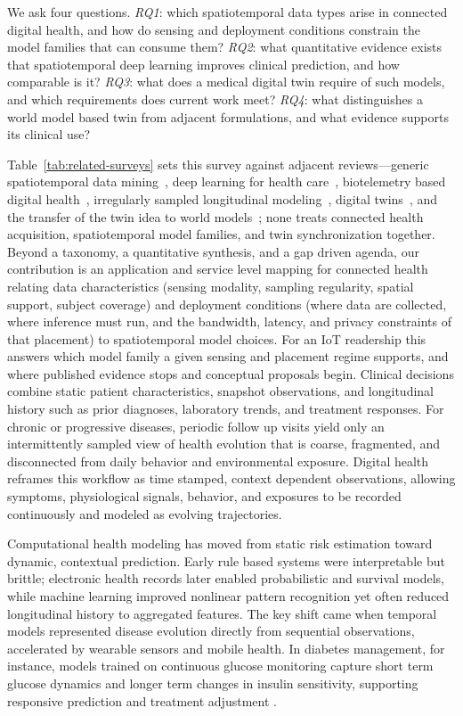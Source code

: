 \documentclass[journal]{IEEEtran}
\begin{document}
We ask four questions. \emph{RQ1}: which spatiotemporal data types arise in connected digital health, and how do sensing and deployment conditions constrain the model families that can consume them? \emph{RQ2}: what quantitative evidence exists that spatiotemporal deep learning improves clinical prediction, and how comparable is it? \emph{RQ3}: what does a medical digital twin require of such models, and which requirements does current work meet? \emph{RQ4}: what distinguishes a world model based twin from adjacent formulations, and what evidence supports its clinical use?

Table~\ref{tab:related-surveys} sets this survey against adjacent reviews---generic spatiotemporal data mining~\cite{wang2022deep,atluri2018stdm}, deep learning for health care~\cite{miotto2018deeplearning}, biotelemetry based digital health~\cite{Busnatu2022}, irregularly sampled longitudinal modeling~\cite{shukla2021irregular}, digital twins~\cite{Wang2023Survey,Sel2025VVUQ}, and the transfer of the twin idea to world models~\cite{Zheng2026DTtoWM}; none treats connected health acquisition, spatiotemporal model families, and twin synchronization together. Beyond a taxonomy, a quantitative synthesis, and a gap driven agenda, our contribution is an application and service level mapping for connected health relating data characteristics (sensing modality, sampling regularity, spatial support, subject coverage) and deployment conditions (where data are collected, where inference must run, and the bandwidth, latency, and privacy constraints of that placement) to spatiotemporal model choices. For an IoT readership this answers which model family a given sensing and placement regime supports, and where published evidence stops and conceptual proposals begin.
\else
Clinical decisions combine static patient characteristics, snapshot observations, and longitudinal history such as prior diagnoses, laboratory trends, and treatment responses. For chronic or progressive diseases, periodic follow up visits yield only an intermittently sampled view of health evolution that is coarse, fragmented, and disconnected from daily behavior and environmental exposure. Digital health reframes this workflow as time stamped, context dependent observations, allowing symptoms, physiological signals, behavior, and exposures to be recorded continuously and modeled as evolving trajectories.

Computational health modeling has moved from static risk estimation toward dynamic, contextual prediction. Early rule based systems were interpretable but brittle; electronic health records later enabled probabilistic and survival models, while machine learning improved nonlinear pattern recognition yet often reduced longitudinal history to aggregated features. The key shift came when temporal models represented disease evolution directly from sequential observations, accelerated by wearable sensors and mobile health. In diabetes management, for instance, models trained on continuous glucose monitoring capture short term glucose dynamics and longer term changes in insulin sensitivity, supporting responsive prediction and treatment adjustment \cite{Vaughan2025CGMPrediction,Gecili2020CGMPrediction}.
\end{document}
